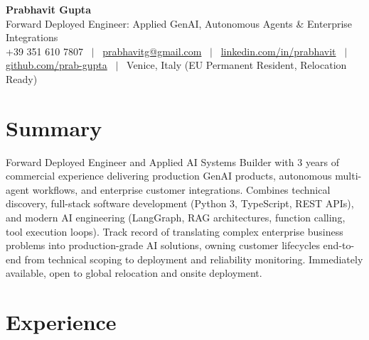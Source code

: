\documentclass[a4paper,10pt]{article}
\begin{document}
\begin{minipage}[c]{0.80\textwidth}
  {\Huge\bfseries Prabhavit Gupta}\\[3pt]
  {\color{accent}\large Forward Deployed Engineer: Applied GenAI, Autonomous Agents \& Enterprise Integrations}\\[6pt]
  {\footnotesize +39 351 610 7807 ~$\vert$~
  \href{mailto:prabhavitg@gmail.com}{prabhavitg@gmail.com} ~$\vert$~
  \href{https://www.linkedin.com/in/prabhavit/}{linkedin.com/in/prabhavit} ~$\vert$~
  \href{https://github.com/prab-gupta}{github.com/prab-gupta} ~$\vert$~
  Venice, Italy (EU Permanent Resident, Relocation Ready)}
\end{minipage}\hfill

\section{Summary}
Forward Deployed Engineer and Applied AI Systems Builder with 3 years of commercial experience delivering production GenAI products, autonomous multi-agent workflows, and enterprise customer integrations. Combines technical discovery, full-stack software development (Python 3, TypeScript, REST APIs), and modern AI engineering (LangGraph, RAG architectures, function calling, tool execution loops). Track record of translating complex enterprise business problems into production-grade AI solutions, owning customer lifecycles end-to-end from technical scoping to deployment and reliability monitoring. Immediately available, open to global relocation and onsite deployment.

\section{Experience}
\end{document}
